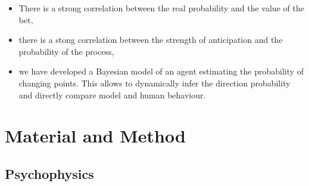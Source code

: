 \documentclass[profile,final,english, draft]{article}%
\begin{document}
\begin{itemize}\setlength{\itemsep}{0ex}
\item There is a strong correlation between the real probability and the value of the bet,

\item there is a stong correlation between the strength of anticipation and the probability of the process,

\item we have developed a Bayesian model of an agent estimating the probability of changing points. This allows to dynamically infer the direction probability and directly compare model and human behaviour.

%

\end{itemize}
\section{Material and Method}
\subsection{Psychophysics}



\end{document}
